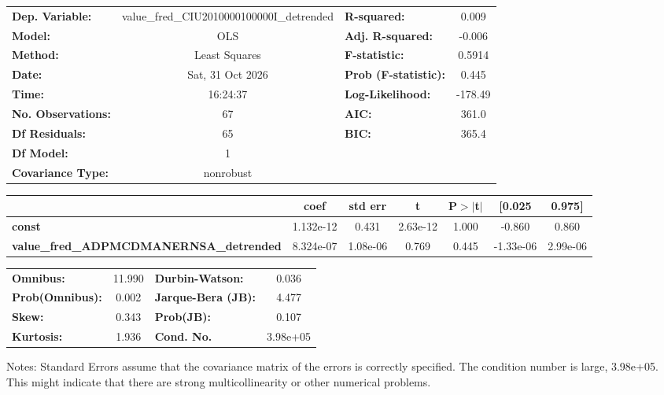 \begin{center}
\begin{tabular}{lclc}
\toprule
\textbf{Dep. Variable:}                         & value\_fred\_CIU2010000100000I\_detrended & \textbf{  R-squared:         } &     0.009   \\
\textbf{Model:}                                 &                    OLS                    & \textbf{  Adj. R-squared:    } &    -0.006   \\
\textbf{Method:}                                &               Least Squares               & \textbf{  F-statistic:       } &    0.5914   \\
\textbf{Date:}                                  &              Sat, 31 Oct 2026             & \textbf{  Prob (F-statistic):} &    0.445    \\
\textbf{Time:}                                  &                  16:24:37                 & \textbf{  Log-Likelihood:    } &   -178.49   \\
\textbf{No. Observations:}                      &                       67                  & \textbf{  AIC:               } &     361.0   \\
\textbf{Df Residuals:}                          &                       65                  & \textbf{  BIC:               } &     365.4   \\
\textbf{Df Model:}                              &                        1                  & \textbf{                     } &             \\
\textbf{Covariance Type:}                       &                 nonrobust                 & \textbf{                     } &             \\
\bottomrule
\end{tabular}
\begin{tabular}{lcccccc}
                                                & \textbf{coef} & \textbf{std err} & \textbf{t} & \textbf{P$> |$t$|$} & \textbf{[0.025} & \textbf{0.975]}  \\
\midrule
\textbf{const}                                  &    1.132e-12  &        0.431     &  2.63e-12  &         1.000        &       -0.860    &        0.860     \\
\textbf{value\_fred\_ADPMCDMANERNSA\_detrended} &    8.324e-07  &     1.08e-06     &     0.769  &         0.445        &    -1.33e-06    &     2.99e-06     \\
\bottomrule
\end{tabular}
\begin{tabular}{lclc}
\textbf{Omnibus:}       & 11.990 & \textbf{  Durbin-Watson:     } &    0.036  \\
\textbf{Prob(Omnibus):} &  0.002 & \textbf{  Jarque-Bera (JB):  } &    4.477  \\
\textbf{Skew:}          &  0.343 & \textbf{  Prob(JB):          } &    0.107  \\
\textbf{Kurtosis:}      &  1.936 & \textbf{  Cond. No.          } & 3.98e+05  \\
\bottomrule
\end{tabular}
\end{center}

Notes: \newline
 [1] Standard Errors assume that the covariance matrix of the errors is correctly specified. \newline
 [2] The condition number is large, 3.98e+05. This might indicate that there are \newline
 strong multicollinearity or other numerical problems.